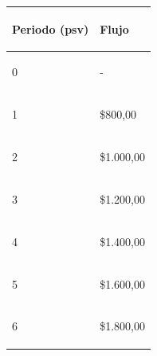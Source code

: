 \begin{spacing}{0.1}
\begin{center}
\begin{tabular}{ |p{3.5cm}| p{3cm}|}
\hline 

\begin{center}\textbf{Periodo (psv) } \end{center}  & \begin{center} \textbf{Flujo} \end{center}  \\ \hline

\begin{center} 0 \end{center}   &  \begin{center} - \end{center}\\\hline

\begin{center}1 \end{center}    &  \begin{center} \$800,00\end{center} \\ \hline

\begin{center}2 \end{center}    &  \begin{center} \$1.000,00\end{center} \\ \hline 

\begin{center}3 \end{center}    & \begin{center} \$1.200,00\end{center}  \\ \hline

\begin{center}4 \end{center}    & \begin{center} \$1.400,00 \end{center}  \\ \hline

\begin{center}5 \end{center}    & \begin{center} \$1.600,00\end{center}  \\ \hline

\begin{center}6 \end{center}    & \begin{center} \$1.800,00 \end{center}  \\ \hline
\end{tabular}
\end{center}
\end{spacing}
\\

